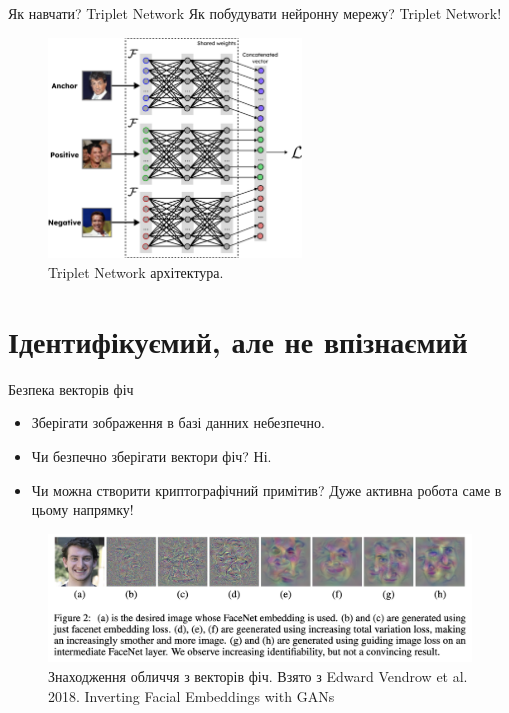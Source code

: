 \documentclass[xcolor={usenames,dvipsnames}]{beamer}
\begin{document}
    \begin{frame}{Як навчати? Triplet Network}
        Як побудувати нейронну мережу? Triplet Network!
        
        \begin{figure}
        \centering
            \includegraphics[width=0.6\textwidth]{images/triplet_network.png}
            \caption{Triplet Network архітектура.}
        \end{figure}
    \end{frame}

    \section{Ідентифікуємий, але не впізнаємий}

    \begin{frame}{Безпека векторів фіч}
        \begin{itemize}
            \item Зберігати зображення в базі данних небезпечно.
            \item Чи безпечно зберігати вектори фіч? Ні.
            \item Чи можна створити криптографічний примітив? Дуже активна робота саме в цьому напрямку!
        \end{itemize}

        \begin{figure}
        \centering
            \includegraphics[width=\textwidth]{images/inverting_facenet.png}
            \caption{Знаходження обличчя з векторів фіч. Взято з Edward Vendrow et al. 2018. Inverting Facial Embeddings with GANs}
        \end{figure}
    \end{frame}
\end{document}

